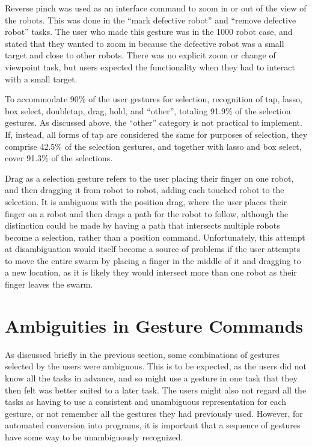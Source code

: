 
Reverse pinch was used as an interface command to zoom in or out of the view of the robots. This was done in the ``mark defective robot'' and ``remove defective robot'' tasks. 
The user who made this gesture was in the 1000 robot case, and stated that they wanted to zoom in because the defective robot was a small target and close to other robots. 
There was no explicit zoom or change of viewpoint task, but users expected the functionality when they had to interact with a small target.

To accommodate 90\% of the user gestures for selection, recognition of tap, lasso, box select, doubletap, drag, hold, and ``other'', totaling 91.9\% of the selection gestures.
As discussed above, the ``other'' category is not practical to implement. 
If, instead, all forms of tap are considered the same for purposes of selection, they comprise 42.5\% of the selection gestures, and together with lasso and box select, cover 91.3\% of the selections. 

Drag as a selection gesture refers to the user placing their finger on one robot, and then dragging it from robot to robot, adding each touched robot to the selection. 
It is ambiguous with the position drag, where the user places their finger on a robot and then drags a path for the robot to follow, although the distinction could be made by having a path that intersects multiple robots become a selection, rather than a position command. 
Unfortunately, this attempt at disambiguation would itself become a source of problems if the user attempts to move the entire swarm by placing a finger in the middle of it and dragging to a new location, as it is likely they would intersect more than one robot as their finger leaves the swarm.

\section{Ambiguities in Gesture Commands}

As discussed briefly in the previous section, some combinations of gestures selected by the users were ambiguous. 
This is to be expected, as the users did not know all the tasks in advance, and so might use a gesture in one task that they then felt was better suited to a later task.
The users might also not regard all the tasks as having to use a consistent and unambiguous representation for each gesture, or not remember all the gestures they had previously used. 
However, for automated conversion into programs, it is important that a sequence of gestures have some way to be unambiguously recognized. 

